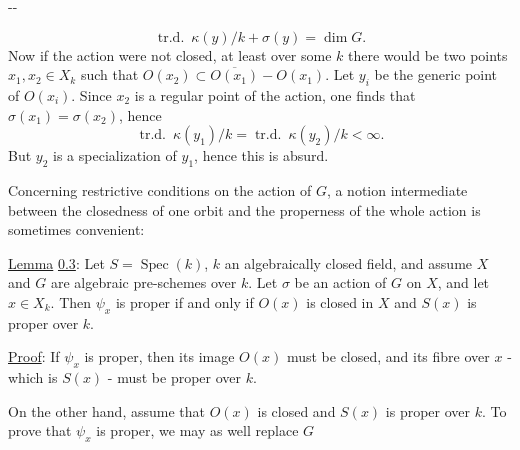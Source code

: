 \begin{center}--\end{center}
\[
\operatorname{tr.d.}\ \kappa(y)/k+\sigma(y)=\dim G.
\]
Now if the action were not closed, at least over some $k$ there would be two points $x_1,x_2\in X_k$ such that $O(x_2)\subset\overline{O(x_1)}-O(x_1)$. Let $y_i$ be the generic point of $O(x_i)$. Since $x_2$ is a regular point of the action, one finds that $\sigma(x_1)=\sigma(x_2)$, hence
\[
\operatorname{tr.d.}\ \kappa(y_1)/k=\operatorname{tr.d.}\ \kappa(y_2)/k<\infty.
\]
But $y_2$ is a specialization of $y_1$, hence this is absurd.

Concerning restrictive conditions on the action of $G$, a notion intermediate between the closedness of one orbit and the properness of the whole action is sometimes convenient:

\uline{Lemma} \uline{0.3}: Let $S=\operatorname{Spec}(k)$, $k$ an algebraically closed field, and assume $X$ and $G$ are algebraic pre-schemes over $k$. Let $\sigma$ be an action of $G$ on $X$, and let $x\in X_k$. Then $\psi_x$ is proper if and only if $O(x)$ is closed in $X$ and $S(x)$ is proper over $k$.

\uline{Proof}: If $\psi_x$ is proper, then its image $O(x)$ must be closed, and its fibre over $x$ - which is $S(x)$ - must be proper over $k$.

On the other hand, assume that $O(x)$ is closed and $S(x)$ is proper over $k$. To prove that $\psi_x$ is proper, we may as well replace $G$
